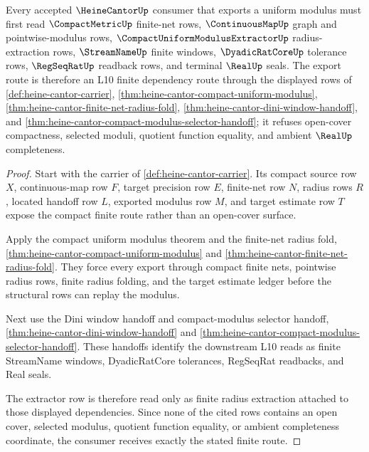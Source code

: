 \begin{theorem}
\label{thm:heine-cantor-compact-uniform-route-scope}
Every accepted $\HeineCantorUp$ consumer that exports a uniform modulus must first read $\CompactMetricUp$ finite-net rows, $\ContinuousMapUp$ graph and pointwise-modulus rows, $\CompactUniformModulusExtractorUp$ radius-extraction rows, $\StreamNameUp$ finite windows, $\DyadicRatCoreUp$ tolerance rows, $\RegSeqRatUp$ readback rows, and terminal $\RealUp$ seals. The export route is therefore an L10 finite dependency route through the displayed rows of \autoref{def:heine-cantor-carrier}, \autoref{thm:heine-cantor-compact-uniform-modulus}, \autoref{thm:heine-cantor-finite-net-radius-fold}, \autoref{thm:heine-cantor-dini-window-handoff}, and \autoref{thm:heine-cantor-compact-modulus-selector-handoff}; it refuses open-cover compactness, selected moduli, quotient function equality, and ambient $\RealUp$ completeness.
\end{theorem}
\begin{proof}
Start with the carrier of \autoref{def:heine-cantor-carrier}. Its compact source row $X$, continuous-map row $F$, target precision row $E$, finite-net row $N$, radius rows $R$, located handoff row $L$, exported modulus row $M$, and target estimate row $T$ expose the compact finite route rather than an open-cover surface.

Apply the compact uniform modulus theorem and the finite-net radius fold, \autoref{thm:heine-cantor-compact-uniform-modulus} and \autoref{thm:heine-cantor-finite-net-radius-fold}. They force every export through compact finite nets, pointwise radius rows, finite radius folding, and the target estimate ledger before the structural rows can replay the modulus.

Next use the Dini window handoff and compact-modulus selector handoff, \autoref{thm:heine-cantor-dini-window-handoff} and \autoref{thm:heine-cantor-compact-modulus-selector-handoff}. These handoffs identify the downstream L10 reads as finite StreamName windows, DyadicRatCore tolerances, RegSeqRat readbacks, and Real seals.

The extractor row is therefore read only as finite radius extraction attached to those displayed dependencies. Since none of the cited rows contains an open cover, selected modulus, quotient function equality, or ambient completeness coordinate, the consumer receives exactly the stated finite route.
\end{proof}

